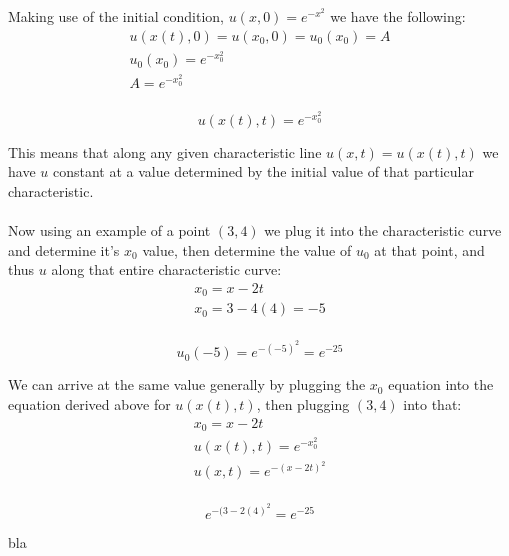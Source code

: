 \documentclass{article}
\begin{document}
Making use of the initial condition, $u(x, 0) = e^{-x^2}$ we have the following:
\begin{equation}
\begin{aligned}
u(x(t), 0) = u(x_0, 0) = u_0(x_0) = A\\
u_0(x_0) = e^{-x_0^2}\\
A = e^{-x_0^2}\\
\end{aligned}
\end{equation}
\begin{tcolorbox}[minipage,colback=white,arc=0pt,outer arc=0pt]
\begin{equation}
u(x(t), t) = e^{-x_0^2}
\end{equation}
\end{tcolorbox}
This means that along any given characteristic line $u(x, t) = u(x(t), t)$ we have $u$ constant at a value determined by the initial value of that particular characteristic.\\
\\
Now using an example of a point $(3,4)$ we plug it into the characteristic curve and determine it's $x_0$ value, then determine the value of $u_0$ at that point, and thus $u$ along that entire characteristic curve:
\begin{equation}
\begin{aligned}
x_0 = x - 2t\\
x_0 = 3 - 4(4) = -5\\
\end{aligned}
\end{equation}
\begin{tcolorbox}[minipage,colback=white,arc=0pt,outer arc=0pt]
\begin{equation}
u_0(-5) = e^{-(-5)^2} = e^{-25}
\end{equation}
\end{tcolorbox}
We can arrive at the same value generally by plugging the $x_0$ equation into the equation derived above for $u(x(t), t)$, then plugging $(3,4)$ into that:
\begin{equation}
\begin{aligned}
x_0 = x - 2t\\
u(x(t), t) = e^{-x_0^2}\\
u(x, t) = e^{-(x - 2t)^2}\\
\end{aligned}
\end{equation}
\begin{tcolorbox}[minipage,colback=white,arc=0pt,outer arc=0pt]
\begin{equation}
e^{-(3 - 2(4)^2} = e^{-25}
\end{equation}
\end{tcolorbox}
bla
\end{document}

